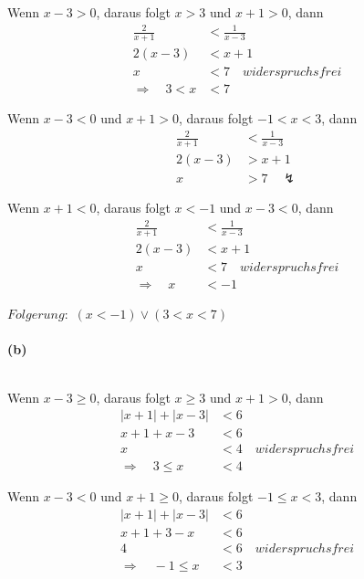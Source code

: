 Wenn $x-3>0$, daraus folgt $x>3$ und $x+1>0$, dann
\begin{align*}
\frac{2}{x+1}&<\frac{1}{x-3}\\
2(x-3)&<x+1\\
x&<7\hspace{1em}widerspruchsfrei\\
\Rightarrow\hspace{1em}3<x&<7
\end{align*}

Wenn $x-3<0$ und $x+1>0$, daraus folgt $-1<x<3$, dann
\begin{align*}
\frac{2}{x+1}&<\frac{1}{x-3}\\
2(x-3)&>x+1\\
x&>7\hspace{1em}\lightning
\end{align*}

Wenn $x+1<0$, daraus folgt $x<-1$ und $x-3<0$, dann
\begin{align*}
\frac{2}{x+1}&<\frac{1}{x-3}\\
2(x-3)&<x+1\\
x&<7\hspace{1em}widerspruchsfrei\\
\Rightarrow\hspace{1em}x&<-1
\end{align*}

$Folgerung:$ $(x<-1)\vee(3<x<7)$

\paragraph{(b)}
$ $\newline

Wenn $x-3\geq0$, daraus folgt $x\geq3$ und $x+1>0$, dann
\begin{align*}
|x+1|+|x-3|&<6\\
x+1+x-3&<6\\
x&<4\hspace{1em}widerspruchsfrei\\
\Rightarrow\hspace{1em}3\leq x&<4
\end{align*}

Wenn $x-3<0$ und $x+1\geq0$, daraus folgt $-1\leq x<3$, dann
\begin{align*}
|x+1|+|x-3|&<6\\
x+1+3-x&<6\\
4&<6\hspace{1em}widerspruchsfrei\\
\Rightarrow\hspace{1em}-1\leq x&<3
\end{align*}


